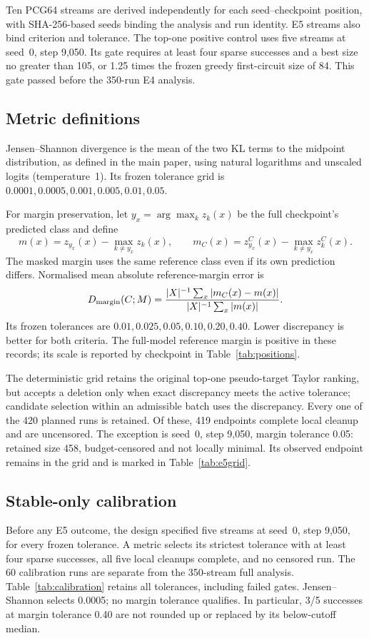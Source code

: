 \documentclass[10pt]{article}
\begin{document}
Ten PCG64 streams are derived independently for each seed--checkpoint position, with SHA-256-based seeds binding the analysis and run identity. E5 streams also bind criterion and tolerance. The top-one positive control uses five streams at seed~0, step 9,050. Its gate requires at least four sparse successes and a best size no greater than 105, or 1.25 times the frozen greedy first-circuit size of 84. This gate passed before the 350-run E4 analysis.

\subsection{Metric definitions}
Jensen--Shannon divergence is the mean of the two KL terms to the midpoint distribution, as defined in the main paper, using natural logarithms and unscaled logits (temperature~1). Its frozen tolerance grid is $0.0001,0.0005,0.001,0.005,0.01,0.05$.

For margin preservation, let $y_x=\arg\max_k z_k(x)$ be the full checkpoint's predicted class and define
\[
 m(x)=z_{y_x}(x)-\max_{k\ne y_x}z_k(x),\qquad
 m_C(x)=z^C_{y_x}(x)-\max_{k\ne y_x}z^C_k(x).
\]
The masked margin uses the same reference class even if its own prediction differs. Normalised mean absolute reference-margin error is
\[
 D_{\mathrm{margin}}(C;M)=\frac{|X|^{-1}\sum_x|m_C(x)-m(x)|}
 {|X|^{-1}\sum_x|m(x)|}.
\]
Its frozen tolerances are $0.01,0.025,0.05,0.10,0.20,0.40$. Lower discrepancy is better for both criteria. The full-model reference margin is positive in these records; its scale is reported by checkpoint in Table~\ref{tab:positions}.

The deterministic grid retains the original top-one pseudo-target Taylor ranking, but accepts a deletion only when exact discrepancy meets the active tolerance; candidate selection within an admissible batch uses the discrepancy. Every one of the 420 planned runs is retained. Of these, 419 endpoints complete local cleanup and are uncensored. The exception is seed~0, step 9,050, margin tolerance 0.05: retained size 458, budget-censored and not locally minimal. Its observed endpoint remains in the grid and is marked in Table~\ref{tab:e5grid}.



\subsection{Stable-only calibration}
Before any E5 outcome, the design specified five streams at seed~0, step 9,050, for every frozen tolerance. A metric selects its strictest tolerance with at least four sparse successes, all five local cleanups complete, and no censored run. The 60 calibration runs are separate from the 350-stream full analysis. Table~\ref{tab:calibration} retains all tolerances, including failed gates. Jensen--Shannon selects 0.0005; no margin tolerance qualifies. In particular, 3/5 successes at margin tolerance 0.40 are not rounded up or replaced by its below-cutoff median.
\end{document}
